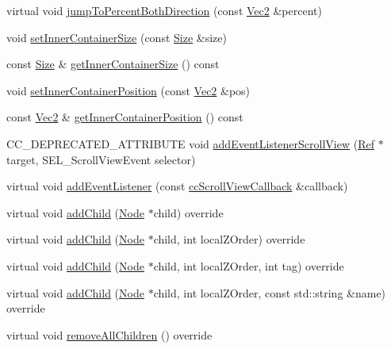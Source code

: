 \begin{DoxyCompactItemize}
\item 
virtual void \hyperlink{classui_1_1ScrollView_a88b2ab06319ea3892829cf14f5a8c89b}{jump\+To\+Percent\+Both\+Direction} (const \hyperlink{classVec2}{Vec2} \&percent)
\item 
void \hyperlink{classui_1_1ScrollView_ac91621ddfb9c7dfa6a1143a4a95e233e}{set\+Inner\+Container\+Size} (const \hyperlink{classSize}{Size} \&size)
\item 
const \hyperlink{classSize}{Size} \& \hyperlink{classui_1_1ScrollView_a63fea0daa8025c5733d630b43a1ae4a9}{get\+Inner\+Container\+Size} () const
\item 
void \hyperlink{classui_1_1ScrollView_a286b3b588fea746f84d10f0ee6a45b6b}{set\+Inner\+Container\+Position} (const \hyperlink{classVec2}{Vec2} \&pos)
\item 
const \hyperlink{classVec2}{Vec2} \& \hyperlink{classui_1_1ScrollView_a0ebc0dfd0a1b7a12104b4f69547158c3}{get\+Inner\+Container\+Position} () const
\item 
C\+C\+\_\+\+D\+E\+P\+R\+E\+C\+A\+T\+E\+D\+\_\+\+A\+T\+T\+R\+I\+B\+U\+TE void \hyperlink{classui_1_1ScrollView_a5f0d2da546a598cd657199b11d69a5f6}{add\+Event\+Listener\+Scroll\+View} (\hyperlink{classRef}{Ref} $\ast$target, S\+E\+L\+\_\+\+Scroll\+View\+Event selector)
\item 
virtual void \hyperlink{classui_1_1ScrollView_a5e0073af37aaba3862eeba44cfa5da7a}{add\+Event\+Listener} (const \hyperlink{classui_1_1ScrollView_ae836cc55536c3cc4f4db5cb99c3c88d5}{cc\+Scroll\+View\+Callback} \&callback)
\item 
virtual void \hyperlink{classui_1_1ScrollView_a33a556579ca4e24b016a787af18cfcae}{add\+Child} (\hyperlink{classNode}{Node} $\ast$child) override
\item 
virtual void \hyperlink{classui_1_1ScrollView_acfd1b4932c3926cf777ef00235c3386b}{add\+Child} (\hyperlink{classNode}{Node} $\ast$child, int local\+Z\+Order) override
\item 
virtual void \hyperlink{classui_1_1ScrollView_ad0b88c4c9c3b6579167a115cd72d4d56}{add\+Child} (\hyperlink{classNode}{Node} $\ast$child, int local\+Z\+Order, int tag) override
\item 
virtual void \hyperlink{classui_1_1ScrollView_a5a7c20a6964a19bfa19bb6522de97055}{add\+Child} (\hyperlink{classNode}{Node} $\ast$child, int local\+Z\+Order, const std\+::string \&name) override
\item 
virtual void \hyperlink{classui_1_1ScrollView_aa036ed1712c78c6ee701eb94eea55091}{remove\+All\+Children} () override
\item 

\end{DoxyCompactItemize}
